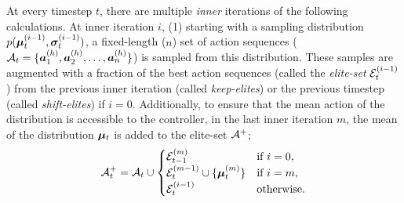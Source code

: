 At every timestep \(t\), there are multiple \emph{inner} iterations of the following calculations.
At inner iteration \(i\),
(1) starting with a sampling distribution \( p(\bm{\mu}_{t}^{(i - 1)},\bm{\sigma}_{t}^{(i - 1)} )\), a fixed-length (\(n\)) set of action sequences (\(\mathcal{A}_t = \{ \bm{a}^{(h)}_1, \bm{a}^{(h)}_2, \ldots, \bm{a}^{(h)}_{n} \}\)) is sampled from this distribution.
These samples are augmented with a fraction of the best action sequences (called the \emph{elite-set} \(\mathcal{E}_t^{(i - 1)}\)) from the previous inner iteration (called \emph{keep-elites}) or the previous timestep (called \emph{shift-elites}) if \(i = 0\). 
Additionally, to ensure that the mean action of the distribution is accessible to the controller, in the last inner iteration \(m\), the mean of the distribution \(\bm{\mu}_t\) is added to the elite-set \(\mathcal{A}^+\);
\begin{equation}
    \label{eq:icem-augment}
    \mathcal{A}^+_t = \mathcal{A}_t \cup \begin{cases}
            \mathcal{E}_{t - 1}^{(m)} & \text{if } i = 0,\\
            \mathcal{E}_t^{(m - 1)} \cup \{ \bm{\mu}_t^{(m)} \} & \text{if } i = m,\\
            \mathcal{E}_t^{(i - 1)} & \text{otherwise}.
    \end{cases}
\end{equation}

